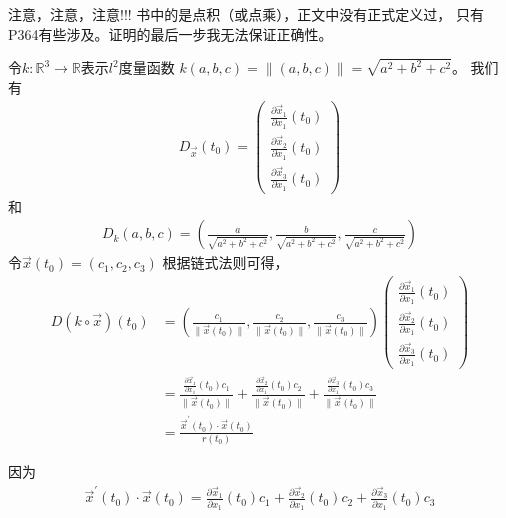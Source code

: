 \documentclass{article}
\begin{document}
注意，注意，注意!!! 书中的是点积（或点乘），正文中没有正式定义过，
只有P364有些涉及。证明的最后一步我无法保证正确性。

令$k: \mathbb{R}^3 \to \mathbb{R}$表示$l^2$度量函数
$k(a, b, c) = \|(a, b, c)\| = \sqrt{a^2 + b^2 + c^2}$。
我们有
\begin{align*}
  D_{\overrightarrow{x}}(t_0) =
  \begin{pmatrix}
    \frac{\partial \overrightarrow{x}_1}{\partial x_1} (t_0) \\
    \frac{\partial \overrightarrow{x}_2}{\partial x_1} (t_0) \\
    \frac{\partial \overrightarrow{x}_3}{\partial x_1} (t_0)
  \end{pmatrix}
\end{align*}
和
\begin{align*}
  D_k(a, b, c) = (\frac{a}{\sqrt{a^2 + b^2 + c^2}}, \frac{b}{\sqrt{a^2 + b^2 + c^2}}, \frac{c}{\sqrt{a^2 + b^2 + c^2}})
\end{align*}
令$\overrightarrow{x}(t_0) = (c_1, c_2, c_3)$
根据链式法则可得，
\begin{align*}
  D(k \circ \overrightarrow{x})(t_0)
   & = (\frac{c_1}{\|\overrightarrow{x}(t_0)\|}, \frac{c_2}{\|\overrightarrow{x}(t_0)\|}, \frac{c_3}{\|\overrightarrow{x}(t_0)\|})
  \begin{pmatrix}
    \frac{\partial \overrightarrow{x}_1}{\partial x_1} (t_0) \\
    \frac{\partial \overrightarrow{x}_2}{\partial x_1} (t_0) \\
    \frac{\partial \overrightarrow{x}_3}{\partial x_1} (t_0)
  \end{pmatrix}                                                                       \\
   & = \frac{\frac{\partial \overrightarrow{x}_1}{\partial x_1} (t_0) c_1 }{\|\overrightarrow{x}(t_0)\|}
  + \frac{\frac{\partial \overrightarrow{x}_2}{\partial x_1} (t_0) c_2}{\|\overrightarrow{x}(t_0)\|}
  + \frac{\frac{\partial \overrightarrow{x}_3}{\partial x_1} (t_0) c_3}{\|\overrightarrow{x}(t_0)\|}                                 \\
   & = \frac{\overrightarrow{x}^\prime(t_0) \cdot \overrightarrow{x}(t_0)}{r(t_0)}
\end{align*}

因为
\begin{align*}
  \overrightarrow{x}^\prime(t_0) \cdot \overrightarrow{x}(t_0)
  = \frac{\partial \overrightarrow{x}_1}{\partial x_1} (t_0) c_1 
  + \frac{\partial \overrightarrow{x}_2}{\partial x_1} (t_0) c_2
  + \frac{\partial \overrightarrow{x}_3}{\partial x_1} (t_0) c_3
\end{align*}
\end{document}
